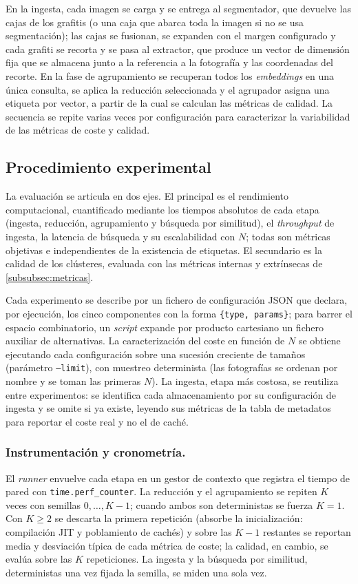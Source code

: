En la ingesta, cada imagen se carga y se entrega al segmentador, que devuelve las
cajas de los grafitis (o una caja que abarca toda la imagen si no se usa
segmentación); las cajas se fusionan, se expanden con el margen configurado y
cada grafiti se recorta y se pasa al extractor, que produce un vector de
dimensión fija que se almacena junto a la referencia a la fotografía y las
coordenadas del recorte. En la fase de agrupamiento se recuperan todos los
\textit{embeddings} en una única consulta, se aplica la reducción seleccionada y
el agrupador asigna una etiqueta por vector, a partir de la cual se calculan las
métricas de calidad. La secuencia se repite varias veces por configuración para
caracterizar la variabilidad de las métricas de coste y calidad.

\subsection{Procedimiento experimental}
\label{subsec:experimental}
La evaluación se articula en dos ejes. El principal es el rendimiento
computacional, cuantificado mediante los tiempos absolutos de cada etapa
(ingesta, reducción, agrupamiento y búsqueda por similitud), el
\textit{throughput} de ingesta, la latencia de búsqueda y su escalabilidad con
$N$; todas son métricas objetivas e independientes de la existencia de
etiquetas. El secundario es la calidad de los clústeres, evaluada con las
métricas internas y extrínsecas de \ref{subsubsec:metricas}.

Cada experimento se describe por un fichero de configuración JSON que declara,
por ejecución, los cinco componentes con la forma \texttt{\{type, params\}}; para barrer el
espacio combinatorio, un
\textit{script} expande por producto cartesiano un fichero auxiliar de
alternativas. La caracterización del coste en función de $N$ se obtiene
ejecutando cada configuración sobre una sucesión creciente de tamaños
(parámetro \texttt{--limit}), con muestreo determinista (las fotografías se
ordenan por nombre y se toman las primeras $N$). La ingesta, etapa más costosa,
se reutiliza entre experimentos: se identifica cada almacenamiento por su
configuración de ingesta y se omite si ya existe, leyendo sus métricas de la
tabla de metadatos para reportar el coste real y no el de caché.

\subsubsection{Instrumentación y cronometría.}
\label{subsubsec:cronometria}
El \textit{runner} envuelve cada etapa en un gestor de contexto que registra el
tiempo de pared con \texttt{time.perf\_counter}. La reducción y el agrupamiento
se repiten $K$ veces con semillas $0,\ldots,K-1$; cuando ambos son
deterministas se fuerza $K=1$. Con $K\geq2$ se descarta la primera repetición
(absorbe la inicialización: compilación JIT y poblamiento de cachés) y sobre las
$K-1$ restantes se reportan media y desviación típica de cada métrica de coste;
la calidad, en cambio, se evalúa sobre las $K$ repeticiones. La ingesta y la
búsqueda por similitud, deterministas una vez fijada la semilla, se miden una
sola vez.

